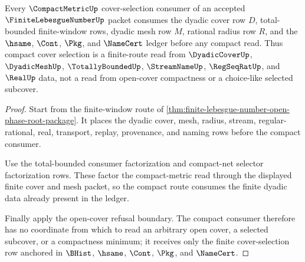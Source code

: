 \begin{theorem}
\label{thm:finite-lebesgue-number-compact-cover-selection-row}
Every $\CompactMetricUp$ cover-selection consumer of an accepted $\FiniteLebesgueNumberUp$ packet consumes the dyadic cover row $D$, total-bounded finite-window rows, dyadic mesh row $M$, rational radius row $R$, and the $\hsame$, $\Cont$, $\Pkg$, and $\NameCert$ ledger before any compact read. Thus compact cover selection is a finite-route read from $\DyadicCoverUp$, $\DyadicMeshUp$, $\TotallyBoundedUp$, $\StreamNameUp$, $\RegSeqRatUp$, and $\RealUp$ data, not a read from open-cover compactness or a choice-like selected subcover.
\end{theorem}
\begin{proof}
Start from the finite-window route of \autoref{thm:finite-lebesgue-number-open-phase-root-package}. It places the dyadic cover, mesh, radius, stream, regular-rational, real, transport, replay, provenance, and naming rows before the compact consumer.

Use the total-bounded consumer factorization and compact-net selector factorization rows. These factor the compact-metric read through the displayed finite cover and mesh packet, so the compact route consumes the finite dyadic data already present in the ledger.

Finally apply the open-cover refusal boundary. The compact consumer therefore has no coordinate from which to read an arbitrary open cover, a selected subcover, or a compactness minimum; it receives only the finite cover-selection row anchored in $\BHist$, $\hsame$, $\Cont$, $\Pkg$, and $\NameCert$.
\end{proof}

